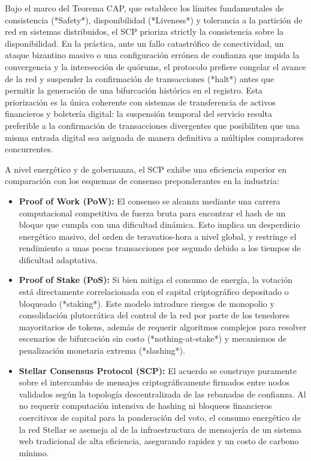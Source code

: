 Bajo el marco del Teorema CAP, que establece los límites fundamentales de consistencia (*Safety*), disponibilidad (*Liveness*) y tolerancia a la partición de red en sistemas distribuidos, el SCP prioriza strictly la consistencia sobre la disponibilidad. En la práctica, ante un fallo catastrófico de conectividad, un ataque bizantino masivo o una configuración errónea de confianza que impida la convergencia y la intersección de quórums, el protocolo prefiere congelar el avance de la red y suspender la confirmación de transacciones (*halt*) antes que permitir la generación de una bifurcación histórica en el registro. Esta priorización es la única coherente con sistemas de transferencia de activos financieros y boletería digital: la suspensión temporal del servicio resulta preferible a la confirmación de transacciones divergentes que posibiliten que una misma entrada digital sea asignada de manera definitiva a múltiples compradores concurrentes.

A nivel energético y de gobernanza, el SCP exhibe una eficiencia superior en comparación con los esquemas de consenso preponderantes en la industria:
\begin{itemize}\setlength{\itemsep}{2pt}
    \item \textbf{Proof of Work (PoW):} El consenso se alcanza mediante una carrera computacional competitiva de fuerza bruta para encontrar el hash de un bloque que cumpla con una dificultad dinámica. Esto implica un desperdicio energético masivo, del orden de teravatios-hora a nivel global, y restringe el rendimiento a unas pocas transacciones por segundo debido a los tiempos de dificultad adaptativa.
    \item \textbf{Proof of Stake (PoS):} Si bien mitiga el consumo de energía, la votación está directamente correlacionada con el capital criptográfico depositado o bloqueado (*staking*). Este modelo introduce riesgos de monopolio y consolidación plutocrática del control de la red por parte de los tenedores mayoritarios de tokens, además de requerir algoritmos complejos para resolver escenarios de bifurcación sin costo (*nothing-at-stake*) y mecanismos de penalización monetaria extrema (*slashing*).
    \item \textbf{Stellar Consensus Protocol (SCP):} El acuerdo se construye puramente sobre el intercambio de mensajes criptográficamente firmados entre nodos validados según la topología descentralizada de las rebanadas de confianza. Al no requerir computación intensiva de hashing ni bloqueos financieros coercitivos de capital para la ponderación del voto, el consumo energético de la red Stellar se asemeja al de la infraestructura de mensajería de un sistema web tradicional de alta eficiencia, asegurando rapidez y un costo de carbono mínimo.
\end{itemize}

